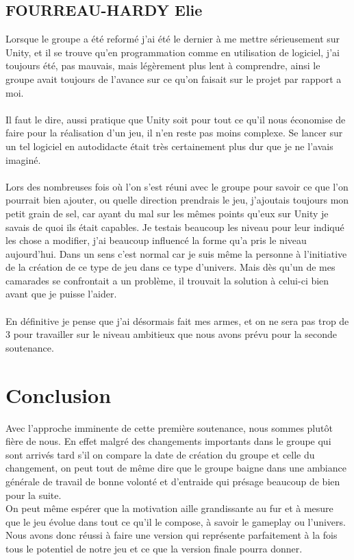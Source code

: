\documentclass[a4paper]{article}
\begin{document}
\pagebreak


\subsection{FOURREAU-HARDY Elie}
\vspace{0.5 cm}

Lorsque le groupe a été reformé j'ai été le dernier à me mettre sérieusement sur Unity, et il se trouve qu'en programmation comme en utilisation de logiciel, j'ai toujours été, pas mauvais, mais légèrement plus lent à comprendre, ainsi le groupe avait toujours de l'avance sur ce qu'on faisait sur le projet par rapport a moi. \\
\\
Il faut le dire, aussi pratique que Unity soit pour tout ce qu'il nous économise de faire pour la réalisation d'un jeu, il n'en reste pas moins complexe. Se lancer sur un tel logiciel en autodidacte était très certainement plus dur que je ne l'avais imaginé.\\
\\
Lors des nombreuses fois où l'on s'est réuni avec le groupe pour savoir ce que l'on pourrait bien ajouter, ou quelle direction prendrais le jeu, j'ajoutais toujours mon petit grain de sel, car ayant du mal sur les mêmes points qu'eux sur Unity je savais de quoi ils était capables. Je testais beaucoup les niveau pour leur indiqué les chose a modifier, j'ai beaucoup influencé la forme qu'a pris le niveau aujourd'hui. Dans un sens c'est normal car je suis même la personne à l’initiative de la création de ce type de jeu dans ce type d'univers. Mais dès qu'un de mes camarades se confrontait a un problème, il trouvait la solution à celui-ci bien avant que je puisse l'aider.\\
\\
En définitive je pense que j'ai désormais fait mes armes, et on ne sera pas trop de 3 pour travailler sur le niveau ambitieux que nous avons prévu pour la seconde soutenance.

\pagebreak

\section{Conclusion}
\vspace{0.5 cm}

Avec l'approche imminente de cette première soutenance, nous sommes plutôt fière de nous. En effet malgré des changements importants dans le groupe qui sont arrivés tard s'il on compare la date de création du groupe et celle du changement, on peut tout de même dire que le groupe baigne dans une ambiance générale de travail de bonne volonté et d'entraide qui présage beaucoup de bien pour la suite.\\
On peut même espérer que la motivation aille grandissante au  fur et à mesure que le jeu évolue dans tout ce qu'il le compose, à savoir le gameplay ou l'univers.\\
Nous avons donc réussi à faire une version qui représente parfaitement à la fois tous le potentiel de notre jeu et ce que la version finale pourra donner.  
\end{document}
